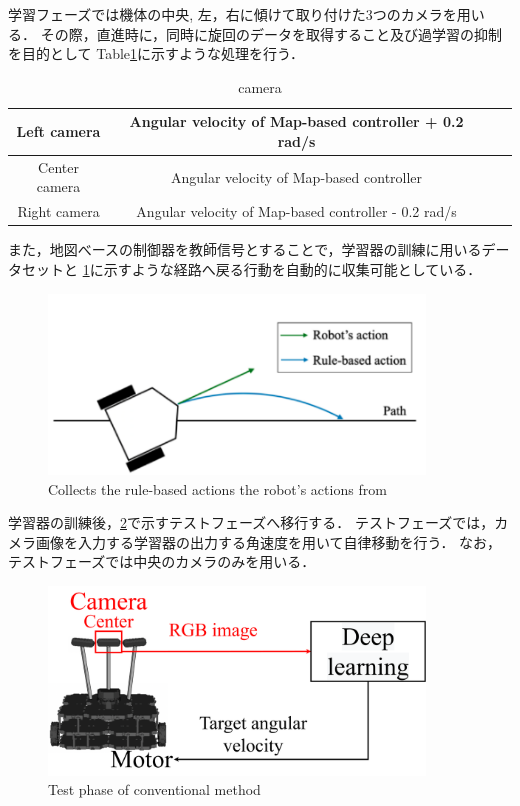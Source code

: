 \newpage
学習フェーズでは機体の中央, 左，右に傾けて取り付けた3つのカメラを用いる．
その際，直進時に，同時に旋回のデータを取得すること及び過学習の抑制を目的として
Table\ref{tb::camera_ang}に示すような処理を行う．
\begin{table}[H]
    \centering
    \caption{camera }
    \begin{tabular}{|c|c|ll}
    \hline
    Left camera   & Angular velocity of Map-based controller + 0.2 rad/s \\ \hline
    Center camera & Angular velocity of Map-based controller             \\ \hline
    Right camera  & Angular velocity of Map-based controller - 0.2 rad/s  \\ \hline
    \end{tabular}
    \label{tb::camera_ang}
    \end{table}
また，地図べースの制御器を教師信号とすることで，学習器の訓練に用いるデータセットと
\ref{fig::okada_path}に示すような経路へ戻る行動を自動的に収集可能としている．
\begin{figure}[h]
    \centering
    \includegraphics[width = 10cm]{./figs/okada_path.png}
    \caption{Collects the rule-based actions the robot's actions from \cite{okada}}
    \label{fig::okada_path}
\end{figure}

\newpage
学習器の訓練後，\ref{fig::okada_method_test}で示すテストフェーズへ移行する．
テストフェーズでは，カメラ画像を入力する学習器の出力する角速度を用いて自律移動を行う．
なお，テストフェーズでは中央のカメラのみを用いる．
\begin{figure}[h]
    \centering
    \includegraphics[width = 10cm]{./figs/okada_method_test.pdf}
    \caption{Test phase of conventional method}
    \label{fig::okada_method_test}
\end{figure}